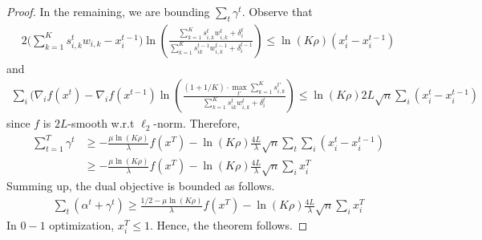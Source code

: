 \begin{proof}
In the remaining, we are bounding $\sum_{t} \gamma^{t}$. Observe that
%
\begin{align*}
2\biggl( \sum_{k=1}^{K} s_{i,k}^{t} w_{i,k}  - x_{i}^{t-1} \biggr) \ln \left( \frac{\sum_{k=1}^{K} s_{i,k}^{t} w_{i,k}^{t} + \delta_{i}^{t}}{\sum_{k=1}^{K}  s_{ik}^{t-1}w_{i,k}^{t-1}  + \delta_{i}^{t-1}} \right)
\leq \ln(K\rho) (x_{i}^{t} - x_{i}^{t-1})
\end{align*}
%
and
\begin{align*}
\sum_{i} (\nabla_{i} f(x^{t}) -  \nabla_{i} f(x^{t-1}) \ln \left( \frac{(1 + 1/K) \cdot \max_{t'} \sum_{k=1}^{K} s_{i,k}^{t'}}{\sum_{k=1}^{K}  s_{ik}^{t}w_{i,k}^{t}  + \delta_{i}^{t}} \right)
\leq \ln(K\rho) 2L\sqrt{n} \sum_{i} (x_{i}^{t} - x_{i}^{t-1})
\end{align*}
since $f$ is $2L$-smooth w.r.t $\ell_{2}$-norm.
Therefore,
\begin{align*}
\sum_{t=1}^{T} \gamma^{t} &\geq - \frac{\mu \ln (K\rho)}{\lambda} f(x^{T}) - \ln(K\rho) \frac{4L}{\lambda} \sqrt{n} \sum_{t} \sum_{i} (x_{i}^{t} - x_{i}^{t-1}) \\
&\geq - \frac{\mu \ln (K\rho)}{\lambda} f(x^{T}) - \ln(K\rho) \frac{4L}{\lambda} \sqrt{n} \sum_{i} x_{i}^{T}
\end{align*}
Summing up, the dual objective is bounded as follows.
\begin{align*}
\sum_{t} (\alpha^{t} + \gamma^{t}) \geq \frac{1/2-\mu\ln (K\rho)}{\lambda} f(x^{T}) - \ln(K\rho) \frac{4L}{\lambda} \sqrt{n} \sum_{i} x_{i}^{T}
\end{align*}
In $0-1$ optimization, $x_{i}^{T} \leq 1$.
Hence, the theorem follows.
\end{proof}

